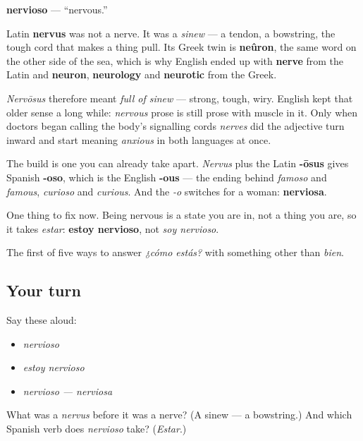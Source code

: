 \begin{cousinweb}
\textbf{nervioso} — \textquotedblleft{}nervous.\textquotedblright{}

Latin \textbf{nervus} was not a nerve. It was a \emph{sinew} — a tendon, a bowstring, the tough cord that makes a thing pull. Its Greek twin is \textbf{neûron}, the same word on the other side of the sea, which is why English ended up with \textbf{nerve} from the Latin and \textbf{neuron}, \textbf{neurology} and \textbf{neurotic} from the Greek.

\emph{Nervōsus} therefore meant \emph{full of sinew} — strong, tough, wiry. English kept that older sense a long while: \emph{nervous} prose is still prose with muscle in it. Only when doctors began calling the body's signalling cords \emph{nerves} did the adjective turn inward and start meaning \emph{anxious} in both languages at once.

The build is one you can already take apart. \emph{Nervus} plus the Latin \textbf{-ōsus} gives Spanish \textbf{-oso}, which is the English \textbf{-ous} — the ending behind \emph{famoso} and \emph{famous}, \emph{curioso} and \emph{curious}. And the \emph{-o} switches for a woman: \textbf{nerviosa}.

One thing to fix now. Being nervous is a state you are in, not a thing you are, so it takes \emph{estar}: \textbf{estoy nervioso}, not \emph{soy nervioso}.
\end{cousinweb}

\begin{grammarlens}[title={What you've built}]
The first of five ways to answer \emph{¿cómo estás?} with something other than \emph{bien}.
\end{grammarlens}

\subsection*{Your turn}
Say these aloud:

\begin{itemize}
\raggedright
  \item \emph{nervioso}
  \item \emph{estoy nervioso}
  \item \emph{nervioso — nerviosa}
\end{itemize}

\begin{tcolorbox}[breakable,colback=teal!4,colframe=teal!35!black,title={Before you move on}]
What was a \emph{nervus} before it was a nerve? (A sinew — a bowstring.) And which Spanish verb does \emph{nervioso} take? (\emph{Estar}.)
\end{tcolorbox}
